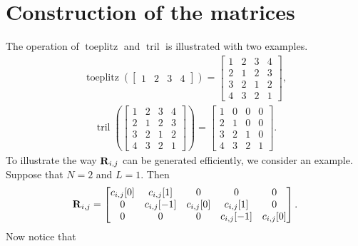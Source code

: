 \documentclass[a4paper, openany, oneside]{memoir}
\begin{document}
\chapter{Construction of the matrices}
\label{sec:reconstruction-generation-algorithm}
The operation of $\operatorname{toeplitz}$ and $\operatorname{tril}$ is illustrated with two examples.
\begin{align*}
    \operatorname{toeplitz}\left(\begin{bmatrix}
        1 & 2 & 3 & 4
    \end{bmatrix}\right) = \begin{bmatrix}
        1 & 2 & 3 & 4 \\
        2 & 1 & 2 & 3 \\
        3 & 2 & 1 & 2 \\
        4 & 3 & 2 & 1
    \end{bmatrix},
\end{align*}
\begin{align*}
    \operatorname{tril}\left(\begin{bmatrix}
        1 & 2 & 3 & 4 \\
        2 & 1 & 2 & 3 \\
        3 & 2 & 1 & 2 \\
        4 & 3 & 2 & 1
    \end{bmatrix}\right) = \begin{bmatrix}
        1 & 0 & 0 & 0 \\
        2 & 1 & 0 & 0 \\
        3 & 2 & 1 & 0 \\
        4 & 3 & 2 & 1
    \end{bmatrix}.
\end{align*}
To illustrate the way $\boldsymbol{\mathbf{R}}_{i,j}$ can be generated efficiently, we consider an example. Suppose that $N=2$ and $L=1$. Then
\begin{align*}
    \boldsymbol{\mathbf{R}}_{i,j} = \begin{bmatrix}
        c_{i,j}[0] & c_{i,j}[1] & 0 & 0 & 0 \\
        0 & c_{i,j}[-1] & c_{i,j}[0] & c_{i,j}[1] & 0 \\
        0 & 0 & 0 & c_{i,j}[-1] & c_{i,j}[0] \\
    \end{bmatrix}.
\end{align*}
Now notice that
\end{document}
